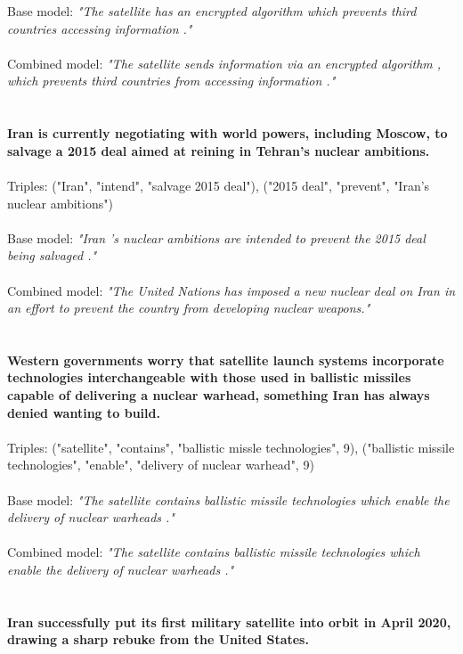 \documentclass[
hf, %
]{ceurart}
\begin{document}
\noindent
Base model: \textit{"The satellite has an encrypted algorithm which prevents third countries accessing information ."}\\\\
\noindent
Combined model: \textit{"The satellite sends information via an encrypted algorithm , which prevents third countries from accessing information ."}\\\\\\
\noindent
\textbf{Iran is currently negotiating with world powers, including Moscow, to salvage a 2015 deal aimed at reining in Tehran's nuclear ambitions.}\\\\
\noindent
Triples: ("Iran", "intend", "salvage 2015 deal"), ("2015 deal", "prevent", "Iran's nuclear ambitions")\\\\
\noindent
Base model: \textit{"Iran 's nuclear ambitions are intended to prevent the 2015 deal being salvaged ."}\\\\
\noindent
Combined model: \textit{"The United Nations has imposed a new nuclear deal on Iran in an effort to prevent the country from developing nuclear weapons."}\\\\\\
\noindent
\textbf{Western governments worry that satellite launch systems incorporate technologies interchangeable with those used in ballistic missiles capable of delivering a nuclear warhead, something Iran has always denied wanting to build.}\\\\
\noindent
Triples: ("satellite", "contains", "ballistic missle technologies", 9), ("ballistic missile technologies", "enable", "delivery of nuclear warhead", 9)\\\\
\noindent
Base model: \textit{"The satellite contains ballistic missile technologies which enable the delivery of nuclear warheads ."}\\\\
\noindent
Combined model: \textit{"The satellite contains ballistic missile technologies which enable the delivery of nuclear warheads ."}\\\\\\
\noindent
\textbf{Iran successfully put its first military satellite into orbit in April 2020, drawing a sharp rebuke from the United States.}\\\\
\end{document}
